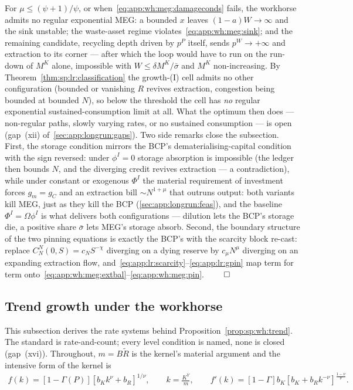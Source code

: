  For $\mu\le\left(\psi+1\right)/\psi$, or
when~\eqref{eq:app:wh:meg:damageconds} fails, the workhorse admits no regular exponential MEG:
a bounded $x$ leaves $\left(1-a\right)W\to\infty$ and the sink unstable; the waste-asset
regime violates~\eqref{eq:app:wh:meg:sink}; and the remaining candidate, recycling depth
driven by $p^P$ itself, sends $p^W\to+\infty$ and extraction to its corner --- after which the
loop would have to run on the run-down of $M^K$ alone, impossible with
$W\le\delta M^K/\bar\sigma$ and $M^K$ non-increasing. By
Theorem~\ref{thm:sp:lr:classification} the growth-(I) cell admits no other configuration
(bounded or vanishing $R$ revives extraction, congestion being bounded at bounded $N$), so
below the threshold the cell has \emph{no} regular exponential sustained-consumption limit at
all. What the optimum then does --- non-regular paths, slowly varying rates, or no sustained
consumption --- is open (gap~(xii) of~\ref{sec:app:longrun:gaps}). Two side remarks close the
subsection. First, the storage condition mirrors the BCP's dematerialising-capital condition
with the sign reversed: under $\phi^I=0$ storage absorption is impossible (the ledger then
bounds $N$, and the diverging credit revives extraction --- a contradiction), while under
constant or exogenous $\Phi^I$ the material requirement of investment forces $g_m=g_C$ and an
extraction bill $\sim N^{1+\mu}$ that outruns output: both variants kill MEG, just as they
kill the BCP (\ref{sec:app:longrun:feas}), and the baseline $\Phi^I=\Omega\phi^I$ is what
delivers both configurations --- dilution lets the BCP's storage die, a positive share
$\bar\sigma$ lets MEG's storage absorb. Second, the boundary structure of the two pinning
equations is exactly the BCP's with the scarcity block re-cast: replace
$C^N_N\left(0,S\right)=c_NS^{-\chi}$ diverging on a dying reserve by $c_\mu N^\mu$ diverging
on an expanding extraction flow, and~\eqref{eq:app:lr:scarcity}--\eqref{eq:app:lr:gpin} map
term for term onto~\eqref{eq:app:wh:meg:extbal}--\eqref{eq:app:wh:meg:pin}.
\hfill$\qed$

\subsection{Trend growth under the workhorse}\label{sec:app:workhorse:trend}

This subsection derives the rate systems behind Proposition~\ref{prop:sp:wh:trend}. The
standard is rate-and-count; every level condition is named, none is closed (gap~(xvi)).
Throughout, $m=B\tilde R$ is the kernel's material argument and the intensive form of the
kernel is
\begin{align}
f\left(k\right)=\left[1-\Gamma\!\left(P\right)\right]\left[b_Kk^{\nu}+b_R\right]^{1/\nu},
\qquad
k=\frac{K^Y}{m},
\qquad
f'\left(k\right)=\left[1-\Gamma\right]b_K\left[b_K+b_Rk^{-\nu}\right]^{\frac{1-\nu}{\nu}} .
\label{eq:app:wh:trend-intensive}
\end{align}


